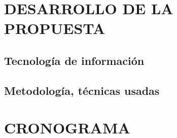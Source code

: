 \documentclass[12pt,letterpaper]{article}
\begin{document}
\section{DESARROLLO DE LA PROPUESTA}
	\subsection{Tecnología de información}
	\subsection{Metodología, técnicas usadas}

\section{CRONOGRAMA}



\cite{1}


\end{document}
